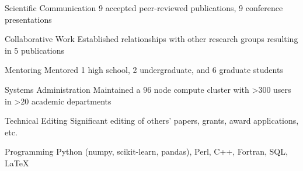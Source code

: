 


\begin{cvskills}


\cvskill
{Scientific Communication} %
{9 accepted peer-reviewed publications, 9 conference presentations} %


\cvskill
{Collaborative Work} %
{Established relationships with other research groups resulting in 5 publications} %


\cvskill
{Mentoring} %
{Mentored 1 high school, 2 undergraduate, and 6 graduate students} %


\cvskill
{Systems Administration} %
{Maintained a 96 node compute cluster with >300 users in >20 academic departments} %


\cvskill
{Technical Editing} %
{Significant editing of others' papers, grants, award applications, etc.} %


\cvskill
{Programming} %
{Python (numpy, scikit-learn, pandas), Perl, C++, Fortran, SQL, LaTeX} %


\end{cvskills}
